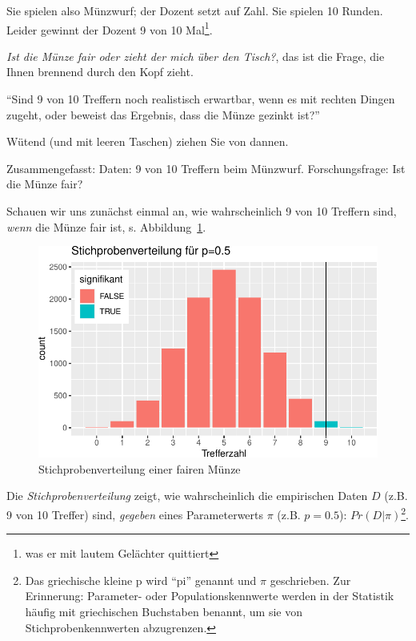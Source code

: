 \documentclass[
  a4paper,
  DIV=11]{scrreprt}
\theoremstyle{definition}
\theoremstyle{remark}
\begin{document}
Sie spielen also Münzwurf; der Dozent setzt auf Zahl. Sie spielen 10
Runden. Leider gewinnt der Dozent 9 von 10 Mal\footnote{was er mit
  lautem Gelächter quittiert}.

\emph{Ist die Münze fair oder zieht der mich über den Tisch?}, das ist
die Frage, die Ihnen brennend durch den Kopf zieht.

``Sind 9 von 10 Treffern noch realistisch erwartbar, wenn es mit rechten
Dingen zugeht, oder beweist das Ergebnis, dass die Münze gezinkt ist?''

Wütend (und mit leeren Taschen) ziehen Sie von dannen.

Zusammengefasst: Daten: 9 von 10 Treffern beim Münzwurf.
Forschungsfrage: Ist die Münze fair?

Schauen wir uns zunächst einmal an, wie wahrscheinlich 9 von 10 Treffern
sind, \emph{wenn} die Münze fair ist, s. Abbildung~\ref{fig-stiprovert}.

\begin{figure}

{\centering \includegraphics{./ppv_files/figure-pdf/fig-stiprovert-1.pdf}

}

\caption{\label{fig-stiprovert}Stichprobenverteilung einer fairen Münze}

\end{figure}

Die \emph{Stichprobenverteilung} zeigt, wie wahrscheinlich die
empirischen Daten \(D\) (z.B. 9 von 10 Treffer) sind, \emph{gegeben}
eines Parameterwerts \(\pi\) (z.B. \(p=0.5\)): \(Pr(D|\pi)\)\footnote{Das
  griechische kleine p wird ``pi'' genannt und \(\pi\) geschrieben. Zur
  Erinnerung: Parameter- oder Populationskennwerte werden in der
  Statistik häufig mit griechischen Buchstaben benannt, um sie von
  Stichprobenkennwerten abzugrenzen.}.
\end{document}

